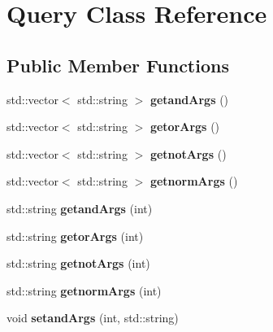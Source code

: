 \hypertarget{class_query}{\section{Query Class Reference}
\label{class_query}
}
\subsection*{Public Member Functions}
\begin{DoxyCompactItemize}
\item 
\hypertarget{class_query_a509091fc6e1bba8544991403a6d7b4b7}{std\+::vector$<$ std\+::string $>$ {\bfseries getand\+Args} ()}\label{class_query_a509091fc6e1bba8544991403a6d7b4b7}

\item 
\hypertarget{class_query_ab90fc81524045a085b472dad8e6032bd}{std\+::vector$<$ std\+::string $>$ {\bfseries getor\+Args} ()}\label{class_query_ab90fc81524045a085b472dad8e6032bd}

\item 
\hypertarget{class_query_a83014fdd314c75564ef1746fccd77407}{std\+::vector$<$ std\+::string $>$ {\bfseries getnot\+Args} ()}\label{class_query_a83014fdd314c75564ef1746fccd77407}

\item 
\hypertarget{class_query_afed0bd695e2b355d42ae78a79c2b2592}{std\+::vector$<$ std\+::string $>$ {\bfseries getnorm\+Args} ()}\label{class_query_afed0bd695e2b355d42ae78a79c2b2592}

\item 
\hypertarget{class_query_aa2e86853eac7f292d4894cf8ef4260b0}{std\+::string {\bfseries getand\+Args} (int)}\label{class_query_aa2e86853eac7f292d4894cf8ef4260b0}

\item 
\hypertarget{class_query_ae3966de9b3bdba292a67b0e418a9d146}{std\+::string {\bfseries getor\+Args} (int)}\label{class_query_ae3966de9b3bdba292a67b0e418a9d146}

\item 
\hypertarget{class_query_a7ef802901ce6e3b7b68e46b2f6659b18}{std\+::string {\bfseries getnot\+Args} (int)}\label{class_query_a7ef802901ce6e3b7b68e46b2f6659b18}

\item 
\hypertarget{class_query_aa7d5b960f0d1cd7c83b7d191ac371d0a}{std\+::string {\bfseries getnorm\+Args} (int)}\label{class_query_aa7d5b960f0d1cd7c83b7d191ac371d0a}

\item 
\hypertarget{class_query_a0497175553ef811642c5b2b3c0bd1ca2}{void {\bfseries setand\+Args} (int, std\+::string)}\label{class_query_a0497175553ef811642c5b2b3c0bd1ca2}


\end{DoxyCompactItemize}
